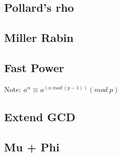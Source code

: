 \documentclass[a4paper,10pt,twocolumn,oneside,x11names]{article}
\begin{document}
\subsection{Pollard's rho}


\subsection{Miller Rabin}


\subsection{Fast Power}
{ \normalsize
Note: $a^n \equiv a^{(n \ mod \ (p-1))} (mod \ p)$
}

\subsection{Extend GCD}


\subsection{Mu + Phi}

\end{document}
